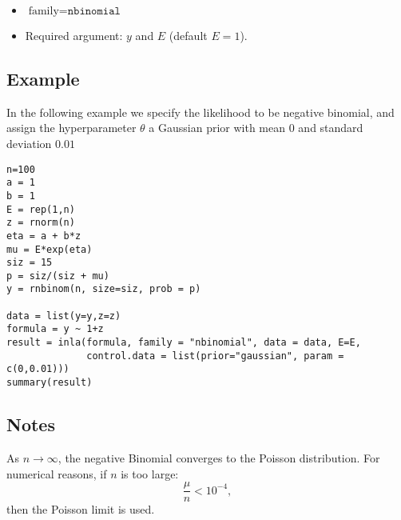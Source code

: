 \documentclass[a4paper,11pt]{article}
\begin{document}
\begin{itemize}
\item $\text{family}=\texttt{nbinomial}$
\item Required argument: $y$ and $E$ (default $E=1$).
\end{itemize}

\subsection*{Example}
In the following example we specify the likelihood to be negative binomial, and assign the hyperparameter $\theta$ a Gaussian prior with mean $0$ and standard deviation $0.01$
 
\begin{verbatim}
n=100
a = 1
b = 1
E = rep(1,n)
z = rnorm(n)
eta = a + b*z
mu = E*exp(eta)
siz = 15
p = siz/(siz + mu)
y = rnbinom(n, size=siz, prob = p)

data = list(y=y,z=z)
formula = y ~ 1+z
result = inla(formula, family = "nbinomial", data = data, E=E,
              control.data = list(prior="gaussian", param = c(0,0.01)))
summary(result)
\end{verbatim}

\subsection*{Notes}

As $n\rightarrow\infty$, the negative Binomial converges to the
Poisson distribution. For numerical reasons, if $n$ is too large:
\begin{displaymath}
    \frac{\mu}{n} < 10^{-4},
\end{displaymath}
then the Poisson limit is used.
\end{document}

